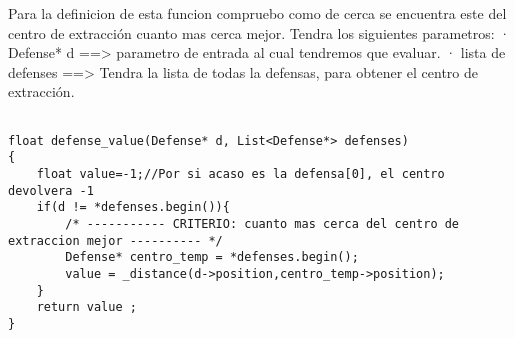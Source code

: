 Para la definicion de esta funcion compruebo como de cerca se encuentra este del 
centro de extracción cuanto mas cerca mejor.
Tendra los siguientes parametros:
    · Defense* d ==> parametro de entrada al cual tendremos que evaluar.
    · lista de defenses ==> Tendra la lista de todas la defensas, para 
      obtener el centro de extracción.
\begin{lstlisting}
    
float defense_value(Defense* d, List<Defense*> defenses)
{
    float value=-1;//Por si acaso es la defensa[0], el centro devolvera -1
    if(d != *defenses.begin()){
        /* ----------- CRITERIO: cuanto mas cerca del centro de extraccion mejor ---------- */
        Defense* centro_temp = *defenses.begin();
        value = _distance(d->position,centro_temp->position);
    }
    return value ; 
}
\end{lstlisting}